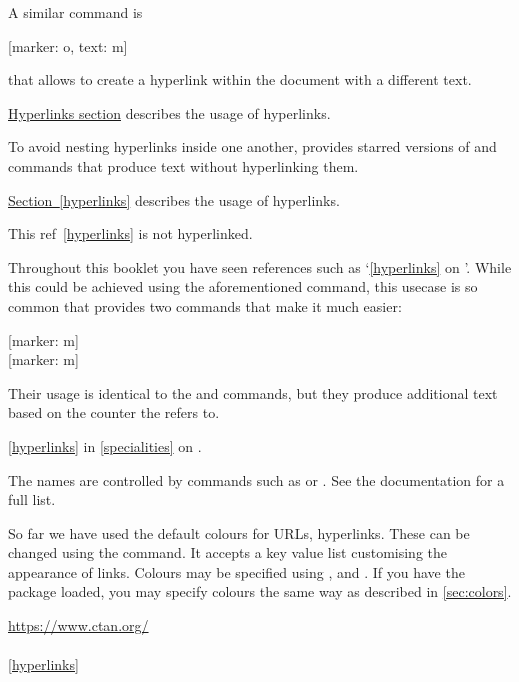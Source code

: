 A similar command is
\begin{lscommand}
  [marker: o, text: m]
\end{lscommand}
that allows to create a hyperlink within the document with a different text.
\begin{example}
\hyperref[hyperlinks]{
  Hyperlinks section}
describes the usage of
hyperlinks.
\end{example}
To avoid nesting hyperlinks inside one another,  provides starred
versions of  and  commands that produce text without
hyperlinking them.
\begin{example}
\hyperref[hyperlinks]{
  Section~\ref*{hyperlinks}}
describes the usage of
hyperlinks.

This ref~\ref*{hyperlinks}
is not hyperlinked.
\end{example}

Throughout this booklet you have seen references such as
\enquote*{\autoref{hyperlinks} on }. While this could
be achieved using the aforementioned  command, this usecase is so
common that  provides two commands that make it much easier:
\begin{lscommand}
  [marker: m] \\
  [marker: m]
\end{lscommand}
Their usage is identical to the  and  commands, but they
produce additional text based on the counter the  refers to.
\begin{example}
\autoref{hyperlinks} in
\autoref{specialities} on
.
\end{example}
The names are controlled by commands such as  or
. See the  documentation for a full list.

So far we have used the default colours for URLs, hyperlinks. These can be
changed using the  command. It accepts a key value list
customising the appearance of links. Colours may be specified using
,  and . If you have the
 package loaded, you may specify colours the same way as described
in \autoref{sec:colors}.
\begin{chktexignore}
\begin{example}
\hypersetup{
  urlcolor = pink,
  citecolor = purple,
  linkcolor = teal!50!yellow,
}
\url{https://www.ctan.org/} \\
\cite{pack:hyperref} \\
\autoref{hyperlinks}
\end{example}
\end{chktexignore}

